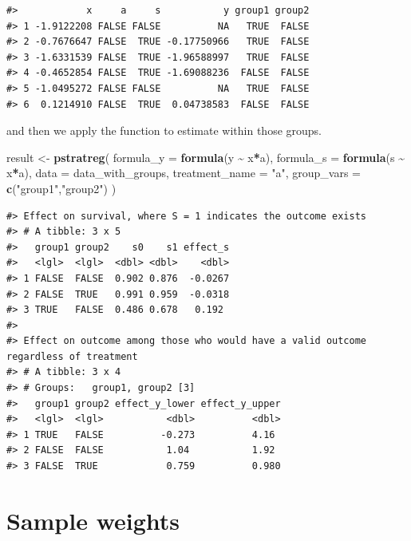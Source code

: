 \documentclass[
]{book}
\newenvironment{Shaded}{\begin{snugshade}}{\end{snugshade}}
\newcommand{\AttributeTok}[1]{\textcolor[rgb]{0.13,0.29,0.53}{#1}}
\newcommand{\FunctionTok}[1]{\textcolor[rgb]{0.13,0.29,0.53}{\textbf{#1}}}
\newcommand{\NormalTok}[1]{#1}
\newcommand{\OtherTok}[1]{\textcolor[rgb]{0.56,0.35,0.01}{#1}}
\newcommand{\SpecialCharTok}[1]{\textcolor[rgb]{0.81,0.36,0.00}{\textbf{#1}}}
\newcommand{\StringTok}[1]{\textcolor[rgb]{0.31,0.60,0.02}{#1}}
\begin{document}
\begin{verbatim}
#>            x     a     s           y group1 group2
#> 1 -1.9122208 FALSE FALSE          NA   TRUE  FALSE
#> 2 -0.7676647 FALSE  TRUE -0.17750966   TRUE  FALSE
#> 3 -1.6331539 FALSE  TRUE -1.96588997   TRUE  FALSE
#> 4 -0.4652854 FALSE  TRUE -1.69088236  FALSE  FALSE
#> 5 -1.0495272 FALSE FALSE          NA   TRUE  FALSE
#> 6  0.1214910 FALSE  TRUE  0.04738583  FALSE  FALSE
\end{verbatim}

and then we apply the function to estimate within those groups.

\begin{Shaded}
\begin{Highlighting}[]
\NormalTok{result }\OtherTok{\textless{}{-}} \FunctionTok{pstratreg}\NormalTok{(}
  \AttributeTok{formula\_y =} \FunctionTok{formula}\NormalTok{(y }\SpecialCharTok{\textasciitilde{}}\NormalTok{ x}\SpecialCharTok{*}\NormalTok{a),}
  \AttributeTok{formula\_s =} \FunctionTok{formula}\NormalTok{(s }\SpecialCharTok{\textasciitilde{}}\NormalTok{ x}\SpecialCharTok{*}\NormalTok{a),}
  \AttributeTok{data =}\NormalTok{ data\_with\_groups,}
  \AttributeTok{treatment\_name =} \StringTok{"a"}\NormalTok{,}
  \AttributeTok{group\_vars =} \FunctionTok{c}\NormalTok{(}\StringTok{"group1"}\NormalTok{,}\StringTok{"group2"}\NormalTok{)}
\NormalTok{)}
\end{Highlighting}
\end{Shaded}

\begin{verbatim}
#> Effect on survival, where S = 1 indicates the outcome exists
#> # A tibble: 3 x 5
#>   group1 group2    s0    s1 effect_s
#>   <lgl>  <lgl>  <dbl> <dbl>    <dbl>
#> 1 FALSE  FALSE  0.902 0.876  -0.0267
#> 2 FALSE  TRUE   0.991 0.959  -0.0318
#> 3 TRUE   FALSE  0.486 0.678   0.192 
#> 
#> Effect on outcome among those who would have a valid outcome regardless of treatment
#> # A tibble: 3 x 4
#> # Groups:   group1, group2 [3]
#>   group1 group2 effect_y_lower effect_y_upper
#>   <lgl>  <lgl>           <dbl>          <dbl>
#> 1 TRUE   FALSE          -0.273          4.16 
#> 2 FALSE  FALSE           1.04           1.92 
#> 3 FALSE  TRUE            0.759          0.980
\end{verbatim}

\section{Sample weights}\label{sample-weights}
\end{document}
